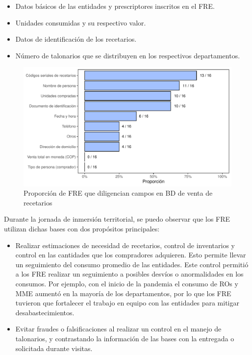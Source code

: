 \documentclass[
]{book}
\begin{document}
\begin{itemize}
\item
  Datos básicos de las entidades y prescriptores inscritos en el FRE.
\item
  Unidades consumidas y su respectivo valor.
\item
  Datos de identificación de los recetarios.
\item
  Número de talonarios que se distribuyen en los respectivos departamentos.
\end{itemize}

\begin{figure}
\includegraphics[width=0.85\linewidth]{InformeFinal_files/figure-latex/BD-diligBDRecet-1} \caption{Proporción de FRE que diligencian campos en BD de venta de recetarios}\label{fig:BD-diligBDRecet}
\end{figure}

Durante la jornada de inmersión territorial, se puedo observar que los FRE utilizan dichas bases con dos propósitos principales:

\begin{itemize}
\item
  Realizar estimaciones de necesidad de recetarios, control de inventarios y control en las cantidades que los compradores adquieren. Esto permite llevar un seguimiento del consumo promedio de las entidades. Este control permitió a los FRE realizar un seguimiento a posibles desvíos o anormalidades en los consumos. Por ejemplo, con el inicio de la pandemia el consumo de ROs y MME aumentó en la mayoría de los departamentos, por lo que los FRE tuvieron que fortalecer el trabajo en equipo con las entidades para mitigar desabastecimientos.
\item
  Evitar fraudes o falsificaciones al realizar un control en el manejo de talonarios, y contrastando la información de las bases con la entregada o solicitada durante visitas.
\end{itemize}
\end{document}
